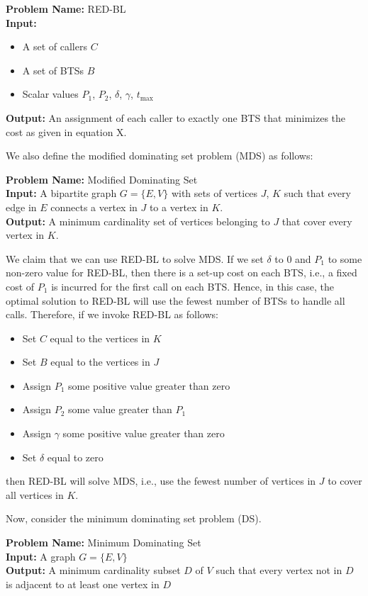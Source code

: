 \noindent
\textbf{Problem Name:} RED-BL\\
\textbf{Input:}
\begin{itemize}
\item A set of callers $C$
\item A set of BTSs $B$
\item Scalar values $P_1$, $P_2$, $\delta$, $\gamma$, $t_{\max}$
\end{itemize}
\textbf{Output:} An assignment of each caller to exactly one BTS that minimizes the cost as given in equation X.

We also define the modified dominating set problem (MDS) as follows:
\medskip

\noindent
\textbf{Problem Name:} Modified Dominating Set\\
\textbf{Input:} A bipartite graph $G=\{E,V\}$ with sets of vertices $J$, $K$ such that every edge in $E$ connects a vertex in $J$ to a vertex in $K$.\\
\textbf{Output:} A minimum cardinality set of vertices belonging to $J$ that cover every vertex in $K$.

We claim that we can use RED-BL to solve MDS. If we set $\delta$ to 0 and $P_1$ to some non-zero value for RED-BL, then there is a set-up cost on each BTS, i.e., a fixed cost of $P_1$ is incurred for the first call on each BTS. Hence, in this case, the optimal solution to RED-BL will use the fewest number of BTSs to handle all calls. Therefore, if we invoke RED-BL as follows:
\begin{itemize}
\item Set $C$ equal to the vertices in $K$
\item Set $B$ equal to the vertices in $J$
\item Assign $P_1$ some positive value greater than zero
\item Assign $P_2$ some value greater than $P_1$
\item Assign $\gamma$ some positive value greater than zero
\item Set $\delta$ equal to zero
\end{itemize}

then RED-BL will solve MDS, i.e., use the fewest number of vertices in $J$ to cover all vertices in $K$.

Now, consider the minimum dominating set problem (DS).
\medskip

\noindent
\textbf{Problem Name:} Minimum Dominating Set\\
\textbf{Input:} A graph $G=\{E,V\}$\\
\textbf{Output:} A minimum cardinality subset $D$ of $V$ such that every vertex not in $D$ is adjacent to at least one vertex in $D$

